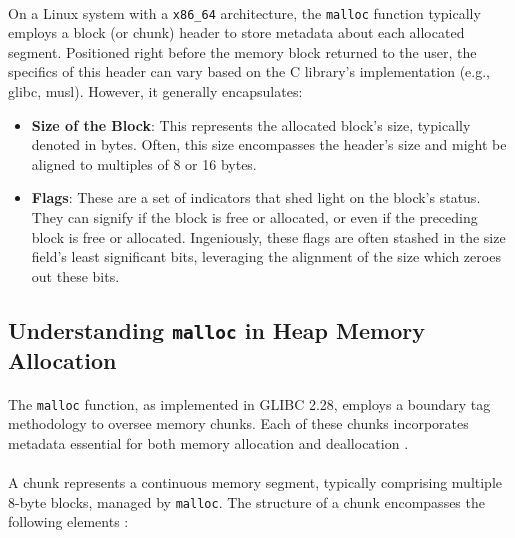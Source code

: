         \paragraph{}On a Linux system with a \texttt{x86\_64} architecture, the \lstinline[language=c]|malloc| function typically employs a block (or chunk) header to store metadata about each allocated segment. Positioned right before the memory block returned to the user, the specifics of this header can vary based on the C library's implementation (e.g., glibc, musl). However, it generally encapsulates:

        \begin{itemize}
            \item \textbf{Size of the Block}: This represents the allocated block's size, typically denoted in bytes. Often, this size encompasses the header's size and might be aligned to multiples of 8 or 16 bytes.
            \item \textbf{Flags}: These are a set of indicators that shed light on the block's status. They can signify if the block is free or allocated, or even if the preceding block is free or allocated. Ingeniously, these flags are often stashed in the size field's least significant bits, leveraging the alignment of the size which zeroes out these bits.
        \end{itemize}

    \subsection{Understanding \texttt{malloc} in Heap Memory Allocation}

        \paragraph{}The \texttt{malloc} function, as implemented in GLIBC 2.28, employs a boundary tag methodology to oversee memory chunks. Each of these chunks incorporates metadata essential for both memory allocation and deallocation \cite{gloger_malloc_2001} \cite{delorie_malloc_2023}. 
        
        \paragraph{}A chunk represents a continuous memory segment, typically comprising multiple 8-byte blocks, managed by \texttt{malloc}. The structure of a chunk encompasses the following elements \cite{delorie_malloc_2023} \cite{unknown_how_2023}:
        
